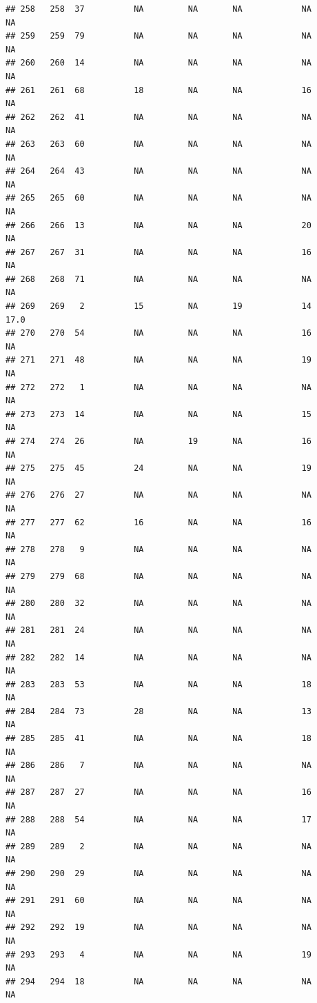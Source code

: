 \documentclass[man]{apa6}
\begin{document}
\begin{verbatim}
## 258   258  37          NA         NA       NA            NA       NA
## 259   259  79          NA         NA       NA            NA       NA
## 260   260  14          NA         NA       NA            NA       NA
## 261   261  68          18         NA       NA            16       NA
## 262   262  41          NA         NA       NA            NA       NA
## 263   263  60          NA         NA       NA            NA       NA
## 264   264  43          NA         NA       NA            NA       NA
## 265   265  60          NA         NA       NA            NA       NA
## 266   266  13          NA         NA       NA            20       NA
## 267   267  31          NA         NA       NA            16       NA
## 268   268  71          NA         NA       NA            NA       NA
## 269   269   2          15         NA       19            14     17.0
## 270   270  54          NA         NA       NA            16       NA
## 271   271  48          NA         NA       NA            19       NA
## 272   272   1          NA         NA       NA            NA       NA
## 273   273  14          NA         NA       NA            15       NA
## 274   274  26          NA         19       NA            16       NA
## 275   275  45          24         NA       NA            19       NA
## 276   276  27          NA         NA       NA            NA       NA
## 277   277  62          16         NA       NA            16       NA
## 278   278   9          NA         NA       NA            NA       NA
## 279   279  68          NA         NA       NA            NA       NA
## 280   280  32          NA         NA       NA            NA       NA
## 281   281  24          NA         NA       NA            NA       NA
## 282   282  14          NA         NA       NA            NA       NA
## 283   283  53          NA         NA       NA            18       NA
## 284   284  73          28         NA       NA            13       NA
## 285   285  41          NA         NA       NA            18       NA
## 286   286   7          NA         NA       NA            NA       NA
## 287   287  27          NA         NA       NA            16       NA
## 288   288  54          NA         NA       NA            17       NA
## 289   289   2          NA         NA       NA            NA       NA
## 290   290  29          NA         NA       NA            NA       NA
## 291   291  60          NA         NA       NA            NA       NA
## 292   292  19          NA         NA       NA            NA       NA
## 293   293   4          NA         NA       NA            19       NA
## 294   294  18          NA         NA       NA            NA       NA

\end{verbatim}
\end{document}
